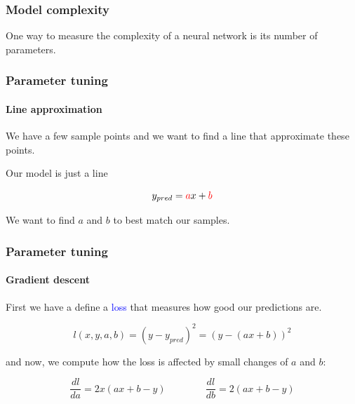 \documentclass[9pt]{beamer}
\begin{document}
\begin{frame}
  \frametitle{Model complexity}

  One way to measure the complexity of a neural network is its number
  of parameters.

  \bigskip
  
  \begin{itemize}
    \bigskip
  \end{itemize}
  
  \bigskip
\end{frame}

\begin{frame}
  \frametitle{Parameter tuning}

  \framesubtitle{Line approximation}

  We have a few sample points and we want to find a line that
  approximate these points. 

  \begin{center}
    \scalebox{0.8}{
      
    }
  \end{center}

  Our model is just a line

  \[
  y_{pred} = \textcolor{red}{a}x + \textcolor{red}{b}
  \]

  \bigskip

  We want to find $a$ and $b$ to best match our samples.

\end{frame}

\begin{frame}
  \frametitle{Parameter tuning}

  \framesubtitle{Gradient descent}

  First we have a define a \textcolor{blue}{loss} that measures how
  good our predictions are.

  \[
  l(x, y, a, b) = (y - y_{pred})^{2} = (y - (a x + b))^{2}
  \]

  \bigskip

  and now, we compute how the loss is affected by small changes of $a$ and
  $b$:

  \medskip

  \[
  \frac{dl}{da} = 2 x (ax + b - y) \qquad \qquad \frac{dl}{db} = 2 (ax + b - y)
  \]
\end{frame}
\end{document}
